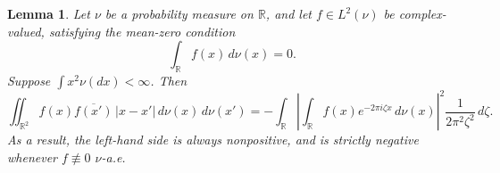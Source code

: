 \documentclass[sn-mathphys-num]{sn-jnl}%
\numberwithin{equation}{section}
\newcommand{\R}{\mathbb{R}}
\newtheorem{lemma}{Lemma}
\newcommand{\profile}{\psi}
\theoremstyle{thmstyleone}%
\theoremstyle{thmstyletwo}%
\newtheorem{remark}{Remark}%
\theoremstyle{thmstylethree}%
\begin{document}
\vspace{.5em} 
\begin{lemma}
\label{lemma:absolute-negative-definite} 
Let $\nu$ be a probability measure on $\mathbb{R}$, and let $f \in L^2(\nu)$ be complex-valued, satisfying the mean-zero condition
\[
\int_{\mathbb{R}} f(x) \, d\nu(x) = 0.
\]
Suppose $\int x^2 \nu(dx) < \infty$. Then 
\[
    \iint_{\mathbb{R}^2} f(x) \overline{f(x')} \, |x - x'| \, d\nu(x) \, d\nu(x')
    = - \int_{\mathbb{R}} \left| \int_{\mathbb{R}} f(x) e^{-2 \pi i \zeta x} \, d\nu(x) \right|^2 \frac{1}{2\pi^2 \zeta^2} \, d \zeta.
\]
As a result, the left-hand side is always nonpositive, and is strictly negative whenever $f \not\equiv 0$ $\nu$-a.e.
\end{lemma}

\end{document}
